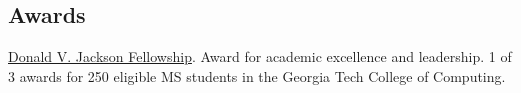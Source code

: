 \subsection*{\textbf{Awards}}
\href{https://sites.gatech.edu/gtcomputingawards2021/graduate-student-awards/}{Donald V. Jackson Fellowship}. Award for academic excellence and leadership. 1 of 3 awards for 250 eligible MS students in the Georgia Tech College of Computing.
